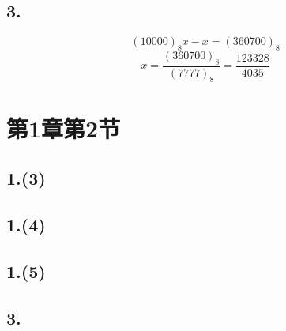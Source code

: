 \documentclass[12pt, a4paper, oneside]{ctexart}
\begin{document}
        \subsection*{3.}
            $$
                (10000)_8x-x=(360700)_8
            $$
            $$
                x=\frac{(360700)_8}{(7777)_8}=\frac{123328}{4035}
            $$
    \section*{第1章第2节}
        \subsection*{1.(3)}
        \subsection*{1.(4)}
        \subsection*{1.(5)}
        \subsection*{3.}
\end{document}
